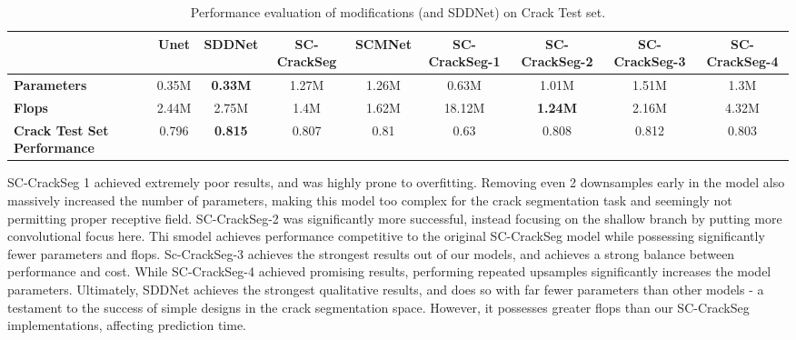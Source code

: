 \documentclass[a4paper,12pt]{report}
\begin{document}
\begin{table}[htbp]
    \begin{adjustbox}{width=\columnwidth,center}
        \begin{tabular}{|p{}|c|c|c|c|c|c|c|c|}
            \hline
                                                & \textbf{Unet} & \textbf{SDDNet} & \textbf{SC-CrackSeg} & \textbf{SCMNet} & \textbf{SC-CrackSeg-1} & \textbf{SC-CrackSeg-2} & \textbf{SC-CrackSeg-3} & \textbf{SC-CrackSeg-4} \\
            \hline
            \textbf{Parameters}                 & 0.35M         & \textbf{0.33M}  & 1.27M                & 1.26M           & 0.63M                  & 1.01M                  & 1.51M                  & 1.3M                   \\
            \hline
            \textbf{Flops}                      & 2.44M         & 2.75M           & 1.4M                 & 1.62M           & 18.12M                 & \textbf{1.24M}         & 2.16M                  & 4.32M                  \\
            \hline
            \textbf{Crack Test Set Performance} & 0.796         & \textbf{0.815}  & 0.807                & 0.81            & 0.63                   & 0.808                  & 0.812                  & 0.803                  \\
            \hline
        \end{tabular}
    \end{adjustbox}
    \caption{Performance evaluation of modifications (and SDDNet) on Crack Test set.}%
\end{table}

SC-CrackSeg 1 achieved extremely poor results, and was highly prone to overfitting. Removing even 2 downsamples early in the model also massively increased the number of parameters, making this model too complex for the crack segmentation task and seemingly not permitting proper receptive field. SC-CrackSeg-2 was significantly more successful, instead focusing on the shallow branch by putting more convolutional focus here. Thi smodel achieves performance competitive to the original SC-CrackSeg model while possessing significantly fewer parameters and flops. Sc-CrackSeg-3 achieves the strongest results out of our models, and achieves a strong balance between performance and cost. While SC-CrackSeg-4 achieved promising results, performing repeated upsamples significantly increases the model parameters. Ultimately, SDDNet achieves the strongest qualitative results, and does so with far fewer parameters than other models - a testament to the success of simple designs in the crack segmentation space. However, it possesses greater flops than our SC-CrackSeg implementations, affecting prediction time.
\end{document}
